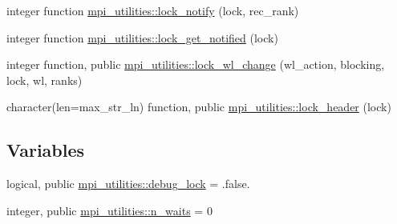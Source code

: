 \begin{DoxyCompactItemize}
\item 
integer function \hyperlink{namespacempi__utilities_a5d2dbf8ffba124237c362f06c3d3ac32}{mpi\+\_\+utilities\+::lock\+\_\+notify} (lock, rec\+\_\+rank)
\item 
integer function \hyperlink{namespacempi__utilities_a9ec02d2ade63716189369640f0da3c5f}{mpi\+\_\+utilities\+::lock\+\_\+get\+\_\+notified} (lock)
\item 
integer function, public \hyperlink{namespacempi__utilities_a0417983d618bfc9f892d6d2af5d27b1d}{mpi\+\_\+utilities\+::lock\+\_\+wl\+\_\+change} (wl\+\_\+action, blocking, lock, wl, ranks)
\item 
character(len=max\+\_\+str\+\_\+ln) function, public \hyperlink{namespacempi__utilities_a4c5de9472574b63c69212948d8a3f4e1}{mpi\+\_\+utilities\+::lock\+\_\+header} (lock)
\end{DoxyCompactItemize}
\subsection*{Variables}
\begin{DoxyCompactItemize}
\item 
logical, public \hyperlink{namespacempi__utilities_a98291c400747762ea4e3f0d751c5d5f5}{mpi\+\_\+utilities\+::debug\+\_\+lock} = .false.
\item 
integer, public \hyperlink{namespacempi__utilities_a38a87fa6a7efbd985592bbef4750f02b}{mpi\+\_\+utilities\+::n\+\_\+waits} = 0
\end{DoxyCompactItemize}
